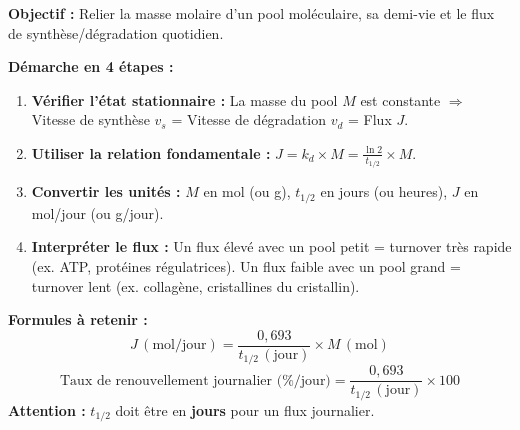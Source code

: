 \documentclass[11pt]{article}
\begin{document}
\begin{methode}
\textbf{Objectif :} Relier la masse molaire d'un pool moléculaire, sa demi-vie et le flux de synthèse/dégradation quotidien.
\par
\textbf{Démarche en 4 étapes :}
\begin{enumerate}
    \item \textbf{Vérifier l'état stationnaire :} La masse du pool $M$ est constante $\Rightarrow$ Vitesse de synthèse $v_s$ = Vitesse de dégradation $v_d$ = Flux $J$.
    \item \textbf{Utiliser la relation fondamentale :} $J = k_d \times M = \frac{\ln 2}{t_{1/2}} \times M$.
    \item \textbf{Convertir les unités :} $M$ en mol (ou g), $t_{1/2}$ en jours (ou heures), $J$ en mol/jour (ou g/jour).
    \item \textbf{Interpréter le flux :} Un flux élevé avec un pool petit = turnover très rapide (ex. ATP, protéines régulatrices). Un flux faible avec un pool grand = turnover lent (ex. collagène, cristallines du cristallin).
\end{enumerate}
\textbf{Formules à retenir :}
\[ J\,(\text{mol/jour}) = \frac{0{,}693}{t_{1/2}\,(\text{jour})} \times M\,(\text{mol}) \]
\[ \text{Taux de renouvellement journalier (\%/jour)} = \frac{0{,}693}{t_{1/2}\,(\text{jour})} \times 100 \]
\textbf{Attention :} $t_{1/2}$ doit être en \textbf{jours} pour un flux journalier.
\end{methode}
\end{document}
